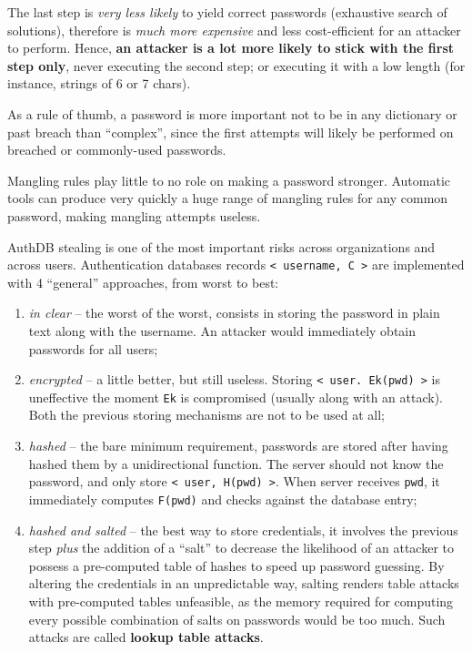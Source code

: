 \documentclass[10pt]{extbook}
\begin{document}
The last step is \emph{very less likely} to yield correct passwords (exhaustive
search of solutions), therefore is \emph{much more expensive} and less
cost\--efficient for an attacker to perform. Hence, \textbf{an attacker is a
lot more likely to stick with the first step only}, never executing the second
step; or executing it with a low length (for instance, strings of 6 or 7
chars).

As a rule of thumb, a password is more important not to be in any dictionary or
past breach than ``complex'', since the first attempts will likely be performed
on breached or commonly\--used passwords.

Mangling rules play little to no role on making a password stronger. Automatic
tools can produce very quickly a huge range of mangling rules for any common
password, making mangling attempts useless.

AuthDB stealing is one of the most important risks across organizations and
across users. Authentication databases records \texttt{< username, C >} are
implemented with 4 ``general'' approaches, from worst to best:
\begin{enumerate}
    \item \emph{in clear} -- the worst of the worst, consists in storing the
        password in plain text along with the username. An attacker would
        immediately obtain passwords for all users;
    \item \emph{encrypted} -- a little better, but still useless. Storing
        \texttt{< user. Ek(pwd) >} is uneffective the moment \texttt{Ek} is
        compromised (usually along with an attack). Both the previous storing
        mechanisms are not to be used at all;
    \item \emph{hashed} -- the bare minimum requirement, passwords are stored
        after having hashed them by a unidirectional function. The server
        should not know the password, and only store \texttt{< user, H(pwd) >}.
        When server receives \texttt{pwd}, it immediately computes
        \texttt{F(pwd)} and checks against the database entry;
    \item \emph{hashed and salted} -- the best way to store credentials, it
        involves the previous step \emph{plus} the addition of a ``salt'' to
        decrease the likelihood of an attacker to possess a pre\--computed
        table of hashes to speed up password guessing. By altering the
        credentials in an unpredictable way, salting renders table attacks with
        pre\--computed tables unfeasible, as the memory required for computing
        every possible combination of salts on passwords would be too much.
        Such attacks are called \textbf{lookup table attacks}.
\end{enumerate}
\end{document}
